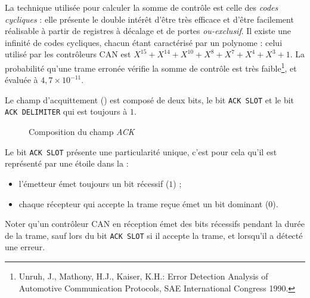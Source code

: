 La technique utilisée pour calculer la somme de contrôle est celle des \emph{codes cycliques} : elle présente le double intérêt d'être très efficace et d'être facilement réalisable à partir de registres à décalage et de portes \emph{ou-exclusif}. Il existe une infinité de codes cycliques, chacun étant caractérisé par un polynome : celui utilisé par les contrôleurs CAN est $X^{15}+X^{14}+X^{10}+X^8+X^7+X^4+X^3+1$. La probabilité qu'une trame erronée vérifie la somme de contrôle est très faible\footnote{Unruh, J., Mathony, H.J., Kaiser, K.H.: Error Detection Analysis of Automotive Communication Protocols, SAE International Congress 1990.}, et évaluée à $4,7 \times 10^{-11}$.





Le champ d'acquittement () est composé de deux bits, le bit \texttt{ACK SLOT} et le bit \texttt{ACK DELIMITER} qui est toujours à $1$.

\begin{figure}[ht]
  \centering
  \caption{Composition du champ \emph{ACK}}
\end{figure}

Le bit \texttt{ACK SLOT} présente une particularité unique, c'est pour cela qu'il est représenté par une étoile dans la  :
\begin{itemize}
  \item l'émetteur émet toujours un bit récessif ($1$) ;
  \item chaque récepteur qui accepte la trame reçue émet un bit dominant ($0$).
\end{itemize}

Noter qu'un contrôleur CAN en réception émet des bits récessifs pendant la durée de la trame, sauf lors du bit \texttt{ACK SLOT} si il accepte la trame, et lorsqu'il a détecté une erreur.

